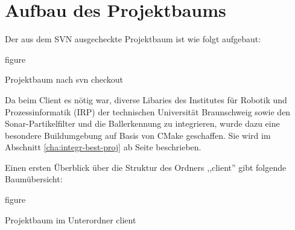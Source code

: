 
\section{Aufbau des Projektbaums}
\label{sec:aufbau_projektbaum}
Der aus dem SVN ausgecheckte Projektbaum  ist wie folgt aufgebaut:\\%

\begin{nofloat}{figure}%
\centering
{}
\caption{Projektbaum nach svn checkout}  
\end{nofloat}
Da beim Client es nötig war, diverse Libaries des Institutes für
Robotik und Prozessinformatik (IRP) der technischen Universität
Braunschweig sowie den Sonar-Partikelfilter und die Ballerkennung zu
integrieren, wurde dazu eine besondere Buildumgebung auf Basis von
CMake geschaffen. Sie
wird im Abschnitt \ref{cha:integr-best-proj} ab Seite
\pageref{cha:integr-best-proj} beschrieben.   

Einen ersten Überblick
über die Struktur des Ordners ,,client'' gibt folgende Baumübersicht:\\

\begin{nofloat}{figure}%
\centering
{}
  \caption{Projektbaum im Unterordner client}
\end{nofloat}  
  
